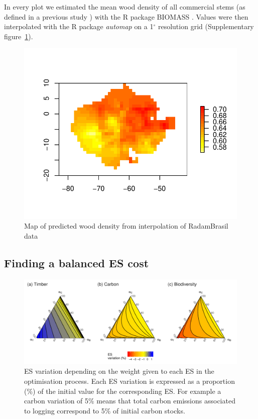 \documentclass{article}
\begin{document}
In every plot we estimated the mean wood density of all commercial stems (as defined in a previous study \cite{Piponiotc}) with the R package BIOMASS \cite{Rejou-Mechain2017}.
Values were then interpolated with the R package \textit{automap} \cite{gstat} on a 1$^{\circ}$ resolution grid (Supplementary figure~\ref{sfig:wdext}).

\begin{figure}
    \centering
    \includegraphics[width=0.7\linewidth]{graphs/map_WDext.pdf}
    \caption{Map of predicted wood density from interpolation of RadamBrasil data}
    \label{sfig:wdext}
\end{figure}

\subsection{Finding a balanced ES cost}


\begin{figure}
    \centering
    \includegraphics[width=\textwidth]{graphs/changingESweights.pdf}
    \caption{ES variation depending on the weight given to each ES in the optimisation process. Each ES variation is expressed as a proportion (\%) of the initial value for the corresponding ES. For example a carbon variation of 5\% means that total carbon emissions associated to logging correspond to 5\% of initial carbon stocks.} 
    \label{fig:changeCosts}
\end{figure}
\end{document}
